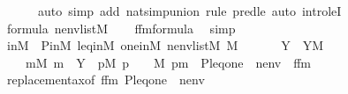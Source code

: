 \begin{isabellebody}
\ \ \ \ \ \ {\isacharparenleft}{\kern0pt}auto\ simp\ add{\isacharcolon}{\kern0pt}\ nat{\isacharunderscore}{\kern0pt}simp{\isacharunderscore}{\kern0pt}union{\isacharcomma}{\kern0pt}\ rule\ pred{\isacharunderscore}{\kern0pt}le{\isacharcomma}{\kern0pt}\ auto\ intro{\isacharcolon}{\kern0pt}leI{\isacharparenright}{\kern0pt}\isanewline
\ \ \isamarkupfalse%
\ \isamarkupfalse%
\ {\isacartoucheopen}{\isasymphi}{\isasymin}formula{\isacartoucheclose}\ {\isacartoucheopen}nenv{\isasymin}list{\isacharparenleft}{\kern0pt}M{\isacharparenright}{\kern0pt}{\isacartoucheclose}\isanewline
\ \ \isamarkupfalse%
\ {\isachardoublequoteopen}{\isacharquery}{\kern0pt}f{\isacharunderscore}{\kern0pt}fm{\isasymin}formula{\isachardoublequoteclose}\ \isamarkupfalse%
\ simp\isanewline
\ \ \isamarkupfalse%
\isanewline
\ \ \isamarkupfalse%
\ inM\ {\isacharequal}{\kern0pt}\ P{\isacharunderscore}{\kern0pt}in{\isacharunderscore}{\kern0pt}M\ leq{\isacharunderscore}{\kern0pt}in{\isacharunderscore}{\kern0pt}M\ one{\isacharunderscore}{\kern0pt}in{\isacharunderscore}{\kern0pt}M\ {\isacartoucheopen}nenv{\isasymin}list{\isacharparenleft}{\kern0pt}M{\isacharparenright}{\kern0pt}{\isacartoucheclose}\ {\isacartoucheopen}{\isacharquery}{\kern0pt}{\isasympi}{\isasymin}M{\isacartoucheclose}\isanewline
\ \ \isamarkupfalse%
\isanewline
\ \ \isamarkupfalse%
\ Y\ \ {\isachardoublequoteopen}Y{\isasymin}M{\isachardoublequoteclose}\isanewline
\ \ \ \ {\isachardoublequoteopen}{\isasymforall}m{\isasymin}M{\isachardot}{\kern0pt}\ m\ {\isasymin}\ Y\ {\isasymlongleftrightarrow}\ {\isacharparenleft}{\kern0pt}{\isasymexists}{\isasymrho}p{\isasymin}M{\isachardot}{\kern0pt}\ {\isasymrho}p\ {\isasymin}\ {\isacharquery}{\kern0pt}{\isasympi}\ {\isasymand}\ M{\isacharcomma}{\kern0pt}\ {\isacharbrackleft}{\kern0pt}{\isasymrho}p{\isacharcomma}{\kern0pt}m{\isacharbrackright}{\kern0pt}\ {\isacharat}{\kern0pt}\ {\isacharparenleft}{\kern0pt}{\isacharbrackleft}{\kern0pt}P{\isacharcomma}{\kern0pt}leq{\isacharcomma}{\kern0pt}one{\isacharbrackright}{\kern0pt}\ {\isacharat}{\kern0pt}\ nenv{\isacharparenright}{\kern0pt}\ {\isasymTurnstile}\ {\isacharquery}{\kern0pt}f{\isacharunderscore}{\kern0pt}fm{\isacharparenright}{\kern0pt}{\isachardoublequoteclose}\isanewline
\ \ \ \ \isamarkupfalse%
\ replacement{\isacharunderscore}{\kern0pt}ax{\isacharbrackleft}{\kern0pt}of\ {\isacharquery}{\kern0pt}f{\isacharunderscore}{\kern0pt}fm\ {\isachardoublequoteopen}{\isacharbrackleft}{\kern0pt}P{\isacharcomma}{\kern0pt}leq{\isacharcomma}{\kern0pt}one{\isacharbrackright}{\kern0pt}\ {\isacharat}{\kern0pt}\ nenv{\isachardoublequoteclose}{\isacharbrackright}{\kern0pt}\isanewline

\end{isabellebody}
